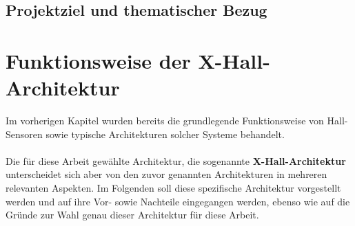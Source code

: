 \documentclass[12pt, a4paper]{article}
\begin{document}
\subsection{Projektziel und thematischer Bezug}


\section{Funktionsweise der X-Hall-Architektur}
Im vorherigen Kapitel wurden bereits die grundlegende Funktionsweise von Hall-Sensoren sowie typische Architekturen solcher Systeme behandelt.\paragraph{}
Die für diese Arbeit gewählte Architektur, die sogenannte \textbf{X-Hall-Architektur} unterscheidet sich aber von den zuvor genannten Architekturen in mehreren relevanten Aspekten. Im Folgenden soll diese spezifische Architektur vorgestellt werden und auf ihre Vor- sowie Nachteile eingegangen werden, ebenso wie auf die Gründe zur Wahl genau dieser %
Architektur für diese Arbeit.
\end{document}
